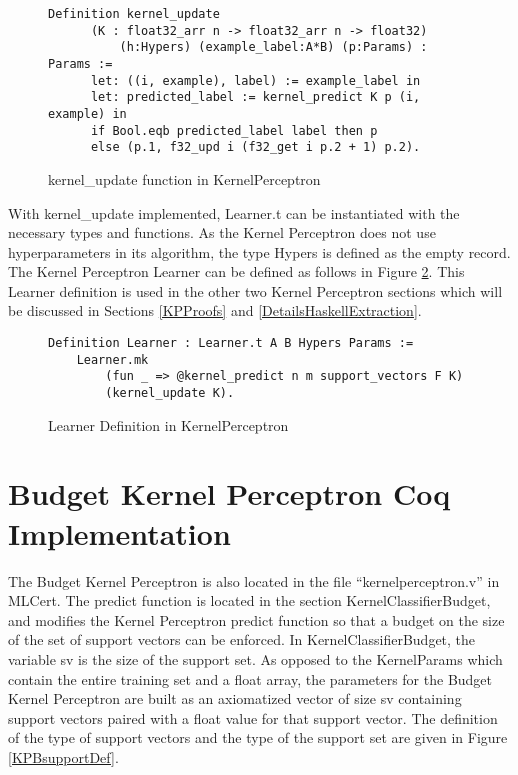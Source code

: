 \begin{figure}
    \caption{kernel\_update function in KernelPerceptron}
    \label{kernel_updateDef}
    \begin{lstlisting}
Definition kernel_update 
      (K : float32_arr n -> float32_arr n -> float32)
          (h:Hypers) (example_label:A*B) (p:Params) : Params :=
      let: ((i, example), label) := example_label in 
      let: predicted_label := kernel_predict K p (i, example) in
      if Bool.eqb predicted_label label then p
      else (p.1, f32_upd i (f32_get i p.2 + 1) p.2).
    \end{lstlisting}
\end{figure}

With kernel\_update implemented, Learner.t can be instantiated with the necessary types and functions. As the Kernel Perceptron does not use hyperparameters in its algorithm, the type Hypers is defined as the empty record. The Kernel Perceptron Learner can be defined as follows in Figure \ref{kpLearnerDef}. This Learner definition is used in the other two Kernel Perceptron sections which will be discussed in Sections \ref{KPProofs} and \ref{DetailsHaskellExtraction}.

\begin{figure}
    \caption{Learner Definition in KernelPerceptron}
    \label{kpLearnerDef}
    \begin{lstlisting}
Definition Learner : Learner.t A B Hypers Params :=
    Learner.mk
        (fun _ => @kernel_predict n m support_vectors F K)
        (kernel_update K).
    \end{lstlisting}
\end{figure}

\section{Budget Kernel Perceptron Coq Implementation}\label{KPBCoqImp}
The Budget Kernel Perceptron is also located in the file ``kernelperceptron.v'' in MLCert. The predict function is located in the section KernelClassifierBudget, and modifies the Kernel Perceptron predict function so that a budget on the size of the set of support vectors can be enforced. In KernelClassifierBudget, the variable sv is the size of the support set. As opposed to the KernelParams which contain the entire training set and a float array, the parameters for the Budget Kernel Perceptron are built as an axiomatized vector of size sv containing support vectors paired with a float value for that support vector. The definition of the type of support vectors and the type of the support set are given in Figure \ref{KPBsupportDef}. 

